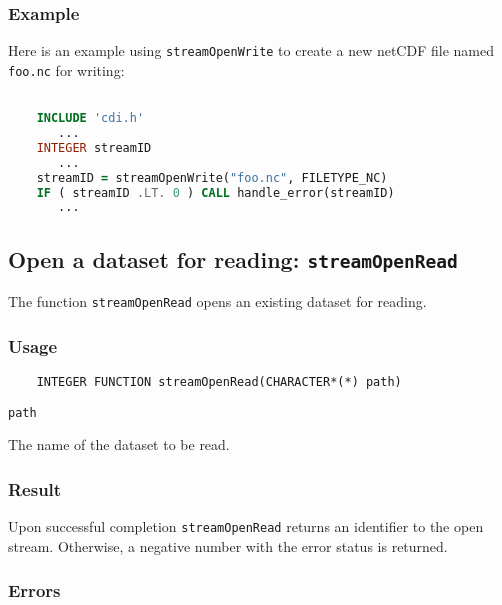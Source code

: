 \subsubsection*{Example}

Here is an example using {\tt streamOpenWrite} to create a new netCDF file named {\tt foo.nc} for writing:

\begin{lstlisting}[language=Fortran, backgroundcolor=\color{pyellow}, basicstyle=\small, columns=flexible]

    INCLUDE 'cdi.h'
       ...
    INTEGER streamID
       ...
    streamID = streamOpenWrite("foo.nc", FILETYPE_NC)
    IF ( streamID .LT. 0 ) CALL handle_error(streamID)
       ...
\end{lstlisting}


\subsection{Open a dataset for reading: {\tt streamOpenRead}}
\label{streamOpenRead}

The function {\tt streamOpenRead} opens an existing dataset for reading.

\subsubsection*{Usage}

\begin{verbatim}
    INTEGER FUNCTION streamOpenRead(CHARACTER*(*) path)
\end{verbatim}

\hspace*{4mm}\begin{minipage}[]{15cm}
\begin{deflist}{\tt path\ }
\item[{\tt path}]
The name of the dataset to be read.

\end{deflist}
\end{minipage}

\subsubsection*{Result}

Upon successful completion {\tt streamOpenRead} returns an identifier to the
open stream. Otherwise, a negative number with the error status is returned.


\subsubsection*{Errors}


